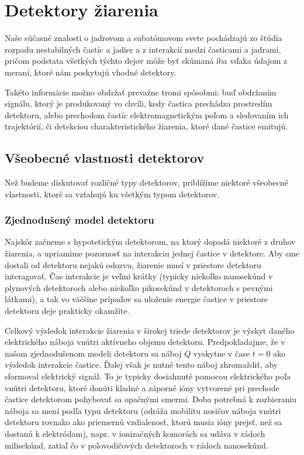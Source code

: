 \documentclass[../../main.tex]{subfiles}
\begin{document}
\chapter{Detektory žiarenia}

Naše súčasné znalosti o jadrovom a subatómovom svete pochádzajú zo štúdia rozpadu nestabilných častíc a jadier a z interakcií medzi časticami a jadrami, pričom podstata všetkých týchto dejov môže byť skúmaná iba vďaka údajom z meraní, ktoré nám poskytujú vhodné detektory.

Takéto informácie možno obdržať prevažne tromi spôsobmi: buď obdržaním signálu, ktorý je produkovaný vo chvíli, kedy častica prechádza prostredím detektoru, alebo prechodom častíc elektromagnetickým poľom a sledovaním ich trajektórií, či detekciou charakteristického žiarenia, ktoré dané častice emitujú.

\section{Všeobecné vlastnosti detektorov}

Než budeme diskutovať rozličné typy detektorov, priblížime niektoré všeobecné vlastnosti, ktoré sa vzťahujú ku všetkým typom detektorov.

\subsection{Zjednodušený model detektoru}

Najskôr začneme s hypotetickým detektorom, na ktorý dopadá niektoré z druhov žiarenia, a upriamime pozornosť na interakciu jednej častice v detektore. Aby sme dostali od detektoru nejakú odozvu, žiarenie musí v priestore detektoru interagovať. Čas interakcie je veľmi krátky (typicky niekoľko nanosekúnd v plynových detektoroch alebo niekoľko pikosekúnd v detektoroch s pevnými látkami), a tak vo väčšine prípadov sa uloženie energie častice v priestore detektoru deje prakticky okamžite.

Celkový výsledok interakcie žiarenia v širokej triede detektorov je výskyt daného elektrického náboja vnútri aktívneho objemu detektoru. Predpokladajme, že v našom zjednodušenom modeli detektoru sa náboj $Q$ vyskytne v čase $t=0$ ako výsledok interakcie častice. Ďalej však je nutné tento náboj zhromaždiť, aby sformoval elektrický signál. To je typicky dosiahnuté pomocou elektrického poľa vnútri detektoru, ktoré donúti kladné a záporné ióny vytvorené pri prechode častice detektorom pohybovať sa opačnými smermi. Doba potrebná k zozbieraniu náboja sa mení podľa typu detektoru (odráža mobilitu nosičov náboja vnútri detektoru rovnako ako priemernú vzdialenosť, ktorú musia ióny prejsť, než sa dostanú k elektródam), napr. v ionizačných komorách sa udáva v rádoch milisekúnd, zatiaľ čo v polovodičových detektoroch v rádoch nanosekúnd.
\end{document}
